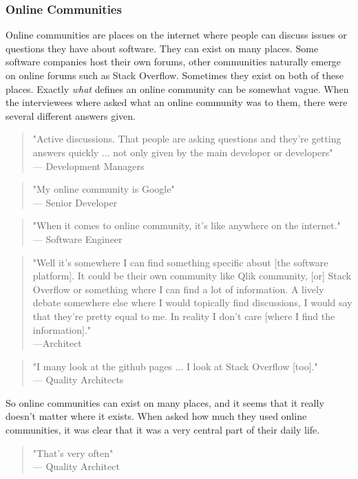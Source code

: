 \documentclass{article}
\begin{document}
\subsubsection{Online Communities}
Online communities are places on the internet where people can discuss issues or questions they have about software. They can exist on many places. Some software companies host their own forums, other communities naturally emerge on online forums such as Stack Overflow. Sometimes they exist on both of these places. Exactly \textit{what} defines an online community can be somewhat vague. When the interviewees where asked what an online community was to them, there were several different answers given.
\begin{quote}
"Active discussions. That people are asking questions and they're getting answers quickly ... not only given by the main developer or developers" \\
--- Development Managers
\end{quote}
\begin{quote}
"My online community is Google"\\
--- Senior Developer
\end{quote}
\begin{quote}
"When it comes to online community, it's like anywhere on the internet."\\
--- Software Engineer
\end{quote}
\begin{quote}
"Well it's somewhere I can find something specific about [the software platform]. It could be their own community like Qlik community, [or] Stack Overflow or something where I can find a lot of information. A lively debate somewhere else where I would topically find discussions, I would say that they're pretty equal to me. In reality I don't care [where I find the information]."
\\---Architect
\end{quote}
\begin{quote}
"I many look at the github pages ... I look at Stack Overflow [too]."\\
--- Quality Architects
\end{quote}
So online communities can exist on many places, and it seems that it really doesn't matter where it exists. When asked how much they used online communities, it was clear that it was a very central part of their daily life.
\begin{quote}
"That's very often"\\ --- Quality Architect
\end{quote}
\end{document}
